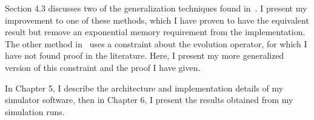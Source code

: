 Section 4.3 discusses two of the generalization techniques found in~\cite{Portugal}. I present my improvement to one of these methods, which I have proven to have the equivalent result but remove an exponential memory requirement from the implementation. The other method in~\cite{Portugal} uses a constraint about the evolution operator, for which I have not found proof in the literature. Here, I present my more generalized version of this constraint and the proof I have given.

In Chapter 5, I describe the architecture and implementation details of my simulator software, then in Chapter 6, I present the results obtained from my simulation runs.
